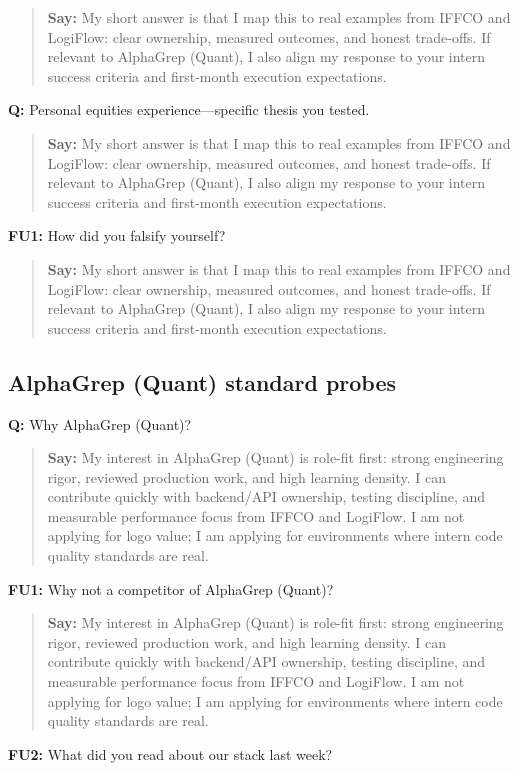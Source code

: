 \documentclass[9pt,a4paper]{article}
\begin{document}
\begin{quote}\small\textbf{Say:} My short answer is that I map this to real examples from IFFCO and LogiFlow: clear ownership, measured outcomes, and honest trade-offs. If relevant to AlphaGrep (Quant), I also align my response to your intern success criteria and first-month execution expectations.\end{quote}
\vspace{2mm}
\textbf{Q:} Personal equities experience---specific thesis you tested.

\begin{quote}\small\textbf{Say:} My short answer is that I map this to real examples from IFFCO and LogiFlow: clear ownership, measured outcomes, and honest trade-offs. If relevant to AlphaGrep (Quant), I also align my response to your intern success criteria and first-month execution expectations.\end{quote}
\vspace{2mm}
\textbf{FU1:} How did you falsify yourself?

\begin{quote}\small\textbf{Say:} My short answer is that I map this to real examples from IFFCO and LogiFlow: clear ownership, measured outcomes, and honest trade-offs. If relevant to AlphaGrep (Quant), I also align my response to your intern success criteria and first-month execution expectations.\end{quote}
\vspace{2mm}
\subsection{AlphaGrep (Quant) standard probes}
\textbf{Q:} Why AlphaGrep (Quant)?

\begin{quote}\small\textbf{Say:} My interest in AlphaGrep (Quant) is role-fit first: strong engineering rigor, reviewed production work, and high learning density. I can contribute quickly with backend/API ownership, testing discipline, and measurable performance focus from IFFCO and LogiFlow. I am not applying for logo value; I am applying for environments where intern code quality standards are real.\end{quote}
\vspace{2mm}
\textbf{FU1:} Why not a competitor of AlphaGrep (Quant)?

\begin{quote}\small\textbf{Say:} My interest in AlphaGrep (Quant) is role-fit first: strong engineering rigor, reviewed production work, and high learning density. I can contribute quickly with backend/API ownership, testing discipline, and measurable performance focus from IFFCO and LogiFlow. I am not applying for logo value; I am applying for environments where intern code quality standards are real.\end{quote}
\vspace{2mm}
\textbf{FU2:} What did you read about our stack last week?
\end{document}
